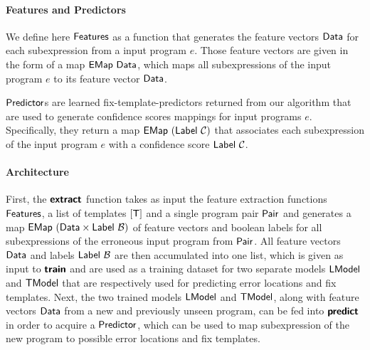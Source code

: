 \paragraph{Features and Predictors}
We define here $\mathsf{Features}$ as a function that generates the feature vectors
$\mathsf{Data}$ for each subexpression from a input program $e$. Those feature
vectors are given in the form of a map $\mathsf{EMap}\ \mathsf{Data}$, which maps all
subexpressions of the input program $e$ to its feature vector $\mathsf{Data}$.

$\mathsf{Predictor}$s are learned fix-template-predictors returned from our algorithm
that are used to generate confidence scores mappings for input programs $e$.
Specifically, they return a map $\mathsf{EMap}\ (\mathsf{Label}\ \mathcal{C})$ that associates each
subexpression of the input program $e$ with a confidence score
$\mathsf{Label}\ \mathcal{C}$.

\paragraph{Architecture}
First, the $\bm{\mathsf{extract}}$ function takes as input the feature extraction
functions $\mathsf{Features}$, a list of templates $[\mathsf{T}]$ and a single program
pair $\mathsf{Pair}$ and generates a map $\mathsf{EMap}\ (\mathsf{Data} \times
\mathsf{Label}\ \mathcal{B})$ of feature vectors and boolean labels for all
subexpressions of the erroneous input program from $\mathsf{Pair}$.
%
All feature vectors $\mathsf{Data}$ and labels $\mathsf{Label}\ \mathcal{B}$ are then
accumulated into one list, which is given as input to $\bm{\mathsf{train}}$ and are used
as a training dataset for two separate models $\mathsf{LModel}$ and $\mathsf{TModel}$ that are
respectively used for predicting error locations and fix templates.
%
Next, the two trained models $\mathsf{LModel}$ and $\mathsf{TModel}$, along with feature vectors
$\mathsf{Data}$ from a new and previously unseen program, can be fed into
$\bm{\mathsf{predict}}$ in order to acquire a $\mathsf{Predictor}$, which can be used to map
subexpression of the new program to possible error locations and fix templates.



